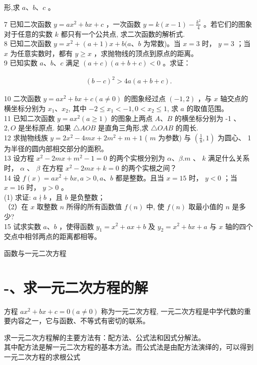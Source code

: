 \documentclass[10pt]{article}
\begin{document}
形,求 $a 、 b 、 c$ 。

7 已知二次函数 $y=a x^{2}+b x+c$ ，一次函数 $y=k(x-1)-\frac{k^{2}}{4}$ 。若它们的图象对于任意的实数 $k$ 都只有一个公共点, 求二次函数的解析式.\\
8 已知二次函数 $y=x^{2}+(a+1) x+b(a 、 b$ 为常数)。当 $x=3$ 时， $y=3$ ；当 $x$ 为任意实数时，都有 $y \geqslant x$ ，求抛物线的顶点到原点的距离。\\
9 已知实数 $a 、 b 、 c$ 满足 $(a+c)(a+b+c)<0$ 。求证：

\begin{align*}
(b-c)^{2}>4 a(a+b+c) .
\end{align*}

10 二次函数 $y=a x^{2}+b x+c(a \neq 0)$ 的图象经过点 $(-1,2)$ ，与 $x$ 轴交点的横坐标分别为 $x_{1} 、 x_{2}$, 其中 $-2 \leqslant x_{1}<-1,0<x_{2} \leqslant 1$, 求 $a$ 的取值范围。\\
11 已知二次函数 $y=a x^{2}(a \geqslant 1)$ 的图象上两点 $A 、 B$ 的横坐标分别为 -1 、 $2, O$ 是坐标原点. 如果 $\triangle A O B$ 是直角三角形,求 $\triangle O A B$ 的周长.\\
12 求抛物线族 $y=2 x^{2}-4 m x+2 m^{2}+m+1$ ( $m$ 为参数) 与 $\left(\frac{1}{8}, 1\right)$ 为圆心、 1 为半径的圆内部相交部分的面积。\\
13 设方程 $x^{2}-2 m x+m^{2}-1=0$ 的两个实根分别为 $\alpha 、 \beta . m$ 、 $k$ 满足什么关系时， $\alpha$ 、 $\beta$ 在方程 $x^{2}-2 m x+k=0$ 的两个实根之间？\\
14 设 $f(x)=a x^{2}+b x, a>0, a 、 b$ 都是整数。且当 $x=15$ 时， $y<0$ ；当 $x=16$ 时， $y>0$ 。\\
(1) 求证: $a \nmid b$ ，且 $b$ 是负整数；\\
（2）在 $x$ 取整数 $n$ 所得的所有函数值 $f(n)$ 中, 使 $f(n)$ 取最小值的 $n$ 是多少?\\
15 试求实数 $a 、 b$ ，使得函数 $y_{1}=x^{2}+a x+b$ 及 $y_{2}=x^{2}+b x+a$ 与 $x$ 轴的四个交点中相邻两点的距离都相等。

函数与一元二次方程

\section*{-、求一元二次方程的解}
方程 $a x^{2}+b x+c=0(a \neq 0)$ 称为一元二次方程, 一元二次方程是中学代数的重要内容之一，它与函数、不等式有密切的联系。

求一元二次方程解的主要方法有：配方法、公式法和因式分解法。\\
其中配方法是解一元二次方程的基本方法。而公式法是由配方法演绎的，可以得到一元二次方程的求根公式
\end{document}
